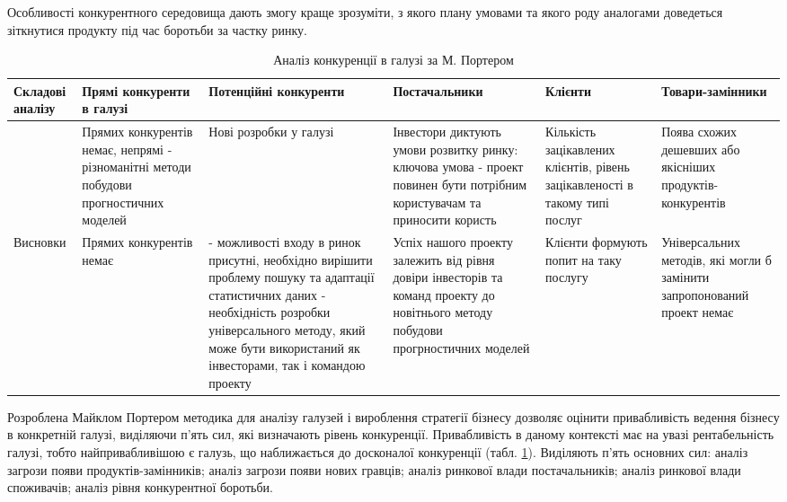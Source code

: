 Особливості конкурентного середовища дають змогу краще зрозуміти, з якого плану умовами та якого роду аналогами доведеться зіткнутися продукту під час боротьби за частку ринку.

\begin{table}[H]
\fontsize{12pt}{12pt}\selectfont
	\begin{tabularx}{\textwidth}{|X|X|X|X|X|X|}
    \hline
    Складові аналізу & Прямі конкуренти в галузі & Потенційні конкуренти & Постачальники & Клієнти & Товари-замінники \\ \hline
     & Прямих конкурентів немає, непрямі - різноманітні методи побудови прогностичних моделей & Нові розробки у галузі & Інвестори диктують умови розвитку ринку: ключова умова - проект повинен бути потрібним користувачам та приносити користь & Кількість зацікавлених клієнтів, рівень зацікавленості в такому типі послуг & Поява схожих дешевших або якісніших продуктів-конкурентів \\ \hline
    Висновки & Прямих конкурентів немає & - можливості входу в ринок присутні, необхідно вирішити проблему пошуку та адаптації статистичних даних - необхідність розробки універсального методу, який може бути використаний як інвесторами, так і командою проекту & Успіх нашого проекту залежить від рівня довіри інвесторів та команд проекту до новітнього методу побудови прогрностичних моделей & Клієнти формують попит на таку послугу & Універсальних методів, які могли б замінити запропонований проект немає \\
    \hline
    \end{tabularx}
\caption{Аналіз конкуренції в галузі за М. Портером} \label{tab:stab_5}
\end{table}

Розроблена Майклом Портером методика для аналізу галузей і вироблення стратегії бізнесу дозволяє оцінити привабливість ведення бізнесу в конкретній галузі, виділяючи п'ять сил, які визначають рівень конкуренції. Привабливість в даному контексті має на увазі рентабельність галузі, тобто найпривабливішою є галузь, що наближається до досконалої конкуренції (табл. \ref{tab:stab_5}). Виділяють п'ять основних сил: аналіз загрози появи продуктів-замінників; аналіз загрози появи нових гравців; аналіз ринкової влади постачальників; аналіз ринкової влади споживачів; аналіз рівня конкурентної боротьби.

